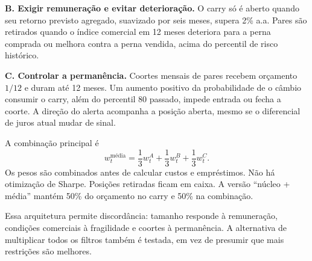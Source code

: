 \documentclass[11pt,a4paper]{article}
\begin{document}
\textbf{B. Exigir remuneração e evitar deterioração.} O carry só é aberto quando seu retorno previsto agregado, suavizado por seis meses, supera 2\% a.a. Pares são retirados quando o índice comercial em 12 meses deteriora para a perna comprada ou melhora contra a perna vendida, acima do percentil de risco histórico.

\textbf{C. Controlar a permanência.} Coortes mensais de pares recebem orçamento $1/12$ e duram até 12 meses. Um aumento positivo da probabilidade de o câmbio consumir o carry, além do percentil 80 passado, impede entrada ou fecha a coorte. A direção do alerta acompanha a posição aberta, mesmo se o diferencial de juros atual mudar de sinal.

A combinação principal é
\[
w^{\mathrm{média}}_t=\frac13w^A_t+\frac13w^B_t+\frac13w^C_t.
\]
Os pesos são combinados antes de calcular custos e empréstimos. Não há otimização de Sharpe. Posições retiradas ficam em caixa. A versão ``núcleo + média'' mantém 50\% do orçamento no carry e 50\% na combinação.

Essa arquitetura permite discordância: tamanho responde à remuneração, condições comerciais à fragilidade e coortes à permanência. A alternativa de multiplicar todos os filtros também é testada, em vez de presumir que mais restrições são melhores.

\clearpage
\end{document}
